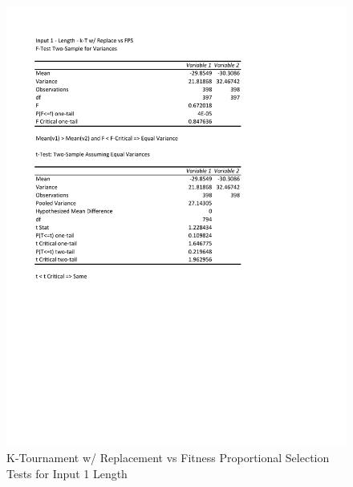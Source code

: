 \documentclass[times]{article}
\begin{document}
	\begin{figure}
		\caption{K-Tournament w/ Replacement vs Fitness Proportional Selection Tests for Input 1 Length}
		\label{fig:1parent1}
		\includegraphics[width=\textwidth]{./t_test/1_parent1.pdf}
	\end{figure}
\end{document}
